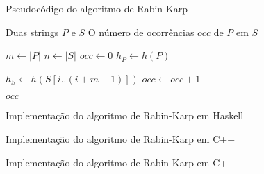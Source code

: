 \begin{frame}[fragile]{Pseudocódigo do algoritmo de Rabin-Karp}

    \begin{algorithm}[H]
        \caption{Algoritmo de Rabin-Karp -- Naive}
        \begin{algorithmic}[1]
            \Require Duas strings $P$ e $S$
            \Ensure O número de ocorrências $occ$ de $P$ em $S$

                \State $m \gets |P|$
                \State $n \gets |S|$
                \State $occ \gets 0$
                \State $h_P \gets h(P)$

                    \State $h_S \gets h(S[i..(i + m - 1)])$
                            \State $occ \gets occ + 1$
                        \EndIf
                    \EndIf
                \EndFor

                \State \Return $occ$
            \EndFunction
        \end{algorithmic}
    \end{algorithm}

\end{frame}

\begin{frame}[fragile]{Implementação do algoritmo de Rabin-Karp em Haskell}
\end{frame}

\begin{frame}[fragile]{Implementação do algoritmo de Rabin-Karp em C++}
\end{frame}

\begin{frame}[fragile]{Implementação do algoritmo de Rabin-Karp em C++}
\end{frame}

